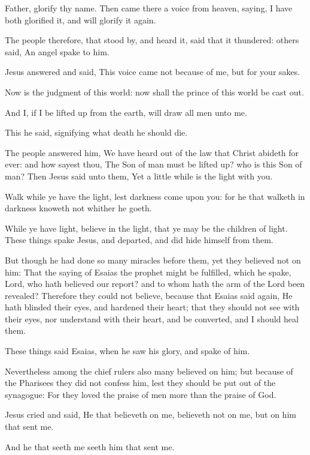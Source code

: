 \verse Father, glorify thy name. Then came there a voice from heaven, saying, I have both glorified it, and will glorify it again.

\verse The people therefore, that stood by, and heard it, said that it thundered: others said, An angel spake to him.

\verse Jesus answered and said, This voice came not because of me, but for your sakes.

\verse Now is the judgment of this world: now shall the prince of this world be cast out.

\verse And I, if I be lifted up from the earth, will draw all men unto me.

\verse This he said, signifying what death he should die.

\verse The people answered him, We have heard out of the law that Christ abideth for ever: and how sayest thou, The Son of man must be lifted up? who is this Son of man?  \verse Then Jesus said unto them, Yet a little while is the light with you.

Walk while ye have the light, lest darkness come upon you: for he that walketh in darkness knoweth not whither he goeth.

\verse While ye have light, believe in the light, that ye may be the children of light. These things spake Jesus, and departed, and did hide himself from them.

\verse But though he had done so many miracles before them, yet they believed not on him: \verse That the saying of Esaias the prophet might be fulfilled, which he spake, Lord, who hath believed our report? and to whom hath the arm of the Lord been revealed?  \verse Therefore they could not believe, because that Esaias said again, \verse He hath blinded their eyes, and hardened their heart; that they should not see with their eyes, nor understand with their heart, and be converted, and I should heal them.

\verse These things said Esaias, when he saw his glory, and spake of him.

\verse Nevertheless among the chief rulers also many believed on him; but because of the Pharisees they did not confess him, lest they should be put out of the synagogue: \verse For they loved the praise of men more than the praise of God.

\verse Jesus cried and said, He that believeth on me, believeth not on me, but on him that sent me.

\verse And he that seeth me seeth him that sent me.

